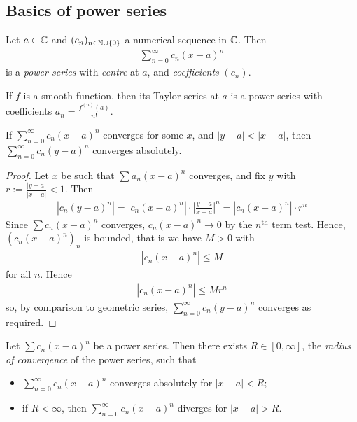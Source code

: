 \documentclass{../template/note}
\begin{document}
    \subsection{Basics of power series}

    \begin{definition}
        Let \(a \in \mathbb C\) and \((c_n)_{n \in \mathbb N \cup \{0\}}\) a numerical sequence in \(\mathbb C\). Then
        \begin{align*}
            \sum_{n=0}^\infty c_n(x-a)^n
        \end{align*}
        is a \emph{power series} with \emph{centre} at \(a\), and \emph{coefficients} \((c_n)\).
    \end{definition}
    
    \begin{example*}
        If \(f\) is a smooth function, then its Taylor series at \(a\) is a power series with coefficients \(a_n = \frac{f^{(n)}(a)}{n!}\).
    \end{example*}
    
    \begin{lemma}
        \label{rad-conv-lemma}
        If \(\sum_{n=0}^\infty c_n (x-a)^n\) converges for some \(x\), and \(|y-a| < |x-a|\), then \(\sum_{n=0}^\infty c_n (y-a)^n\) converges absolutely.
    \end{lemma}
    
    \begin{proof}
        Let \(x\) be such that \(\sum a_n(x-a)^n\) converges, and fix \(y\) with \(r := \frac{|y-a|}{|x-a|} < 1\). Then
        \begin{align*}
            \left|c_n(y-a)^n\right| = \left|c_n(x-a)^n\right| \cdot \left|\frac{y-a}{x-a}\right|^n = \left|c_n(x-a)^n\right|\cdot r^n
        \end{align*}
        Since \(\sum c_n(x-a)^n\) converges, \(c_n(x-a)^n \to 0\) by the \(n^\text{th}\) term test. Hence, \((c_n(x-a)^n)_n\) is bounded, that is we have \(M > 0\) with
        \begin{align*}
            |c_n(x-a)^n| \leq M
        \end{align*}
        for all \(n\). Hence
        \begin{align*}
            |c_n(x-a)^n| \leq Mr^n
        \end{align*}
        so, by comparison to geometric series, \(\sum_{n=0}^\infty c_n(y-a)^n\) converges as required.
    \end{proof}
    
    \begin{proposition}
        Let \(\sum c_n(x-a)^n\) be a power series. Then there exists \(R \in [0, \infty]\), the \emph{radius of convergence} of the power series, such that
        \begin{itemize}
            \item \(\sum_{n=0}^\infty c_n(x-a)^n\) converges absolutely for \(|x-a| < R\);
            \item if \(R < \infty\), then \(\sum_{n=0}^\infty c_n(x-a)^n\) diverges for \(|x-a| > R\).
        \end{itemize}       
    \end{proposition}
\end{document}
